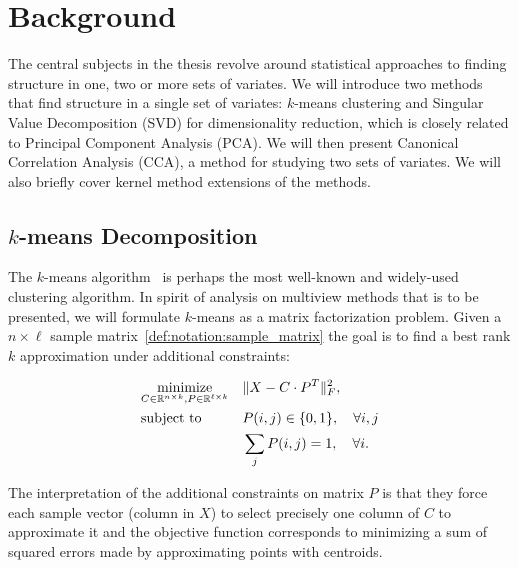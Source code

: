 %
\chapter{Background}\label{chap:background}

The central subjects in the thesis revolve around statistical approaches to finding structure in one, two or more sets of variates. We will
introduce two methods that find structure in a single set of variates: $k$-means clustering and Singular Value Decomposition (SVD) for dimensionality reduction, which is closely related to Principal Component Analysis (PCA). We will then present Canonical Correlation Analysis (CCA), a method for studying two sets of variates. We will also briefly cover kernel method extensions of the methods.


\section{$k$-means Decomposition}\label{chap:background:kmeans}

The $k$-means algorithm~\cite{kmeans} is perhaps the most well-known and widely-used clustering algorithm. In spirit of analysis on multiview methods that is to be presented, we will formulate $k$-means as a matrix factorization problem. Given a $n \times \ell$ sample matrix~\ref{def:notation:sample_matrix}
the goal is to find a best rank $k$ approximation under additional constraints:

\begin{equation}\label{eq:background:kmeans:opt}
\begin{aligned}
& \underset{C \in \mathbb{R}^{n \times k}, P \in \mathbb{R}^{\ell \times k}}{\text{minimize}}
& & \lVert X - C \cdot P^T\rVert_F^2, \\
& \text{subject to}
& & P(i,j) \in \{0,1\}, \quad \forall i,j \\
& & & \sum_j P(i, j) = 1, \quad \forall i.
\end{aligned}
\end{equation}

The interpretation of the additional constraints on matrix $P$ is that they force each sample vector 
(column in $X$) to select precisely one column of $C$ to approximate it and the objective function
corresponds to minimizing a sum of squared errors made by approximating points with centroids.

